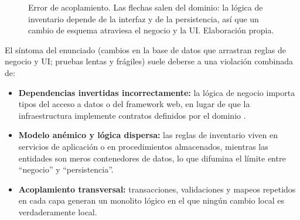 \begin{figure}[H]
  \centering
  \caption{Error de acoplamiento. Las flechas salen del dominio: la lógica de inventario depende de la interfaz y de la persistencia, así que un cambio de esquema atraviesa el negocio y la UI. Elaboración propia.}
  \label{fig:acoplamiento}
\end{figure}

El síntoma del enunciado (cambios en la base de datos que arrastran reglas de negocio y UI;
pruebas lentas y frágiles) suele deberse a una violación combinada de:

\begin{itemize}
  \item \textbf{Dependencias invertidas incorrectamente:} la lógica de negocio importa tipos del
    acceso a datos o del framework web, en lugar de que la infraestructura implemente contratos
    definidos por el dominio \parencite{martin2017clean}.
  \item \textbf{Modelo anémico y lógica dispersa:} las reglas de inventario viven en servicios de
    aplicación o en procedimientos almacenados, mientras las entidades son meros contenedores de
    datos, lo que difumina el límite entre ``negocio'' y ``persistencia''.
  \item \textbf{Acoplamiento transversal:} transacciones, validaciones y mapeos repetidos en cada
    capa generan un monolito lógico en el que ningún cambio local es verdaderamente local.
\end{itemize}

